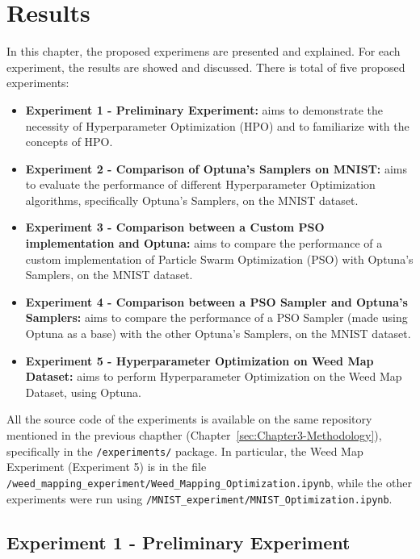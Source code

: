 \chapter{Results}\label{sec:Chapter4-Results}

In this chapter, the proposed experimens are presented and explained. For each experiment, the results are showed and discussed.
There is total of five proposed experiments:
\begin{itemize}[itemsep=0.1cm]
    \item \textbf{Experiment 1 - Preliminary Experiment:} aims to demonstrate the necessity of Hyperparameter Optimization (HPO) and to familiarize with the concepts of HPO.
    \item \textbf{Experiment 2 - Comparison of Optuna's Samplers on MNIST:} aims to evaluate the performance of different Hyperparameter Optimization algorithms, specifically Optuna's Samplers, on the MNIST dataset.
    \item \textbf{Experiment 3 - Comparison between a Custom PSO implementation and Optuna:} aims to compare the performance of a custom implementation of Particle Swarm Optimization (PSO) with Optuna's Samplers, on the MNIST dataset.
    \item \textbf{Experiment 4 - Comparison between a PSO Sampler and Optuna's Samplers:} aims to compare the performance of a PSO Sampler (made using Optuna as a base) with the other Optuna's Samplers, on the MNIST dataset.
    \item \textbf{Experiment 5 - Hyperparameter Optimization on Weed Map Dataset:} aims to perform Hyperparameter Optimization on the Weed Map Dataset, using Optuna.
\end{itemize}

All the source code of the experiments is available on the same repository \cite{Repository-THESIS} mentioned in the previous chapther (Chapter~\ref{sec:Chapter3-Methodology}), specifically in the \texttt{/experiments/} package.
In particular, the Weed Map Experiment (Experiment 5) is in the file \newline\texttt{/weed\_mapping\_experiment/Weed\_Mapping\_Optimization.ipynb}, while the other experiments were run using \texttt{/MNIST\_experiment/MNIST\_Optimization.ipynb}.

\section{Experiment 1 - Preliminary Experiment}

